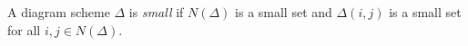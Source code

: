 A diagram scheme $\Delta$ is \emph{small} if $N(\Delta)$ is a small set and $\Delta(i, j)$ is a small set for all $i, j \in N(\Delta)$.
